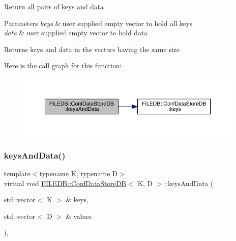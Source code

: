 Return all pairs of keys and data 
\begin{DoxyParams}{Parameters}
{\em keys} & user supplied empty vector to hold all keys \\
\hline
{\em data} & user supplied empty vector to hold data \\
\hline
\end{DoxyParams}
\begin{DoxyReturn}{Returns}
keys and data in the vectors having the same size 
\end{DoxyReturn}
Here is the call graph for this function\+:
\nopagebreak
\begin{figure}[H]
\begin{center}
\leavevmode
\includegraphics[width=350pt]{d8/d19/classFILEDB_1_1ConfDataStoreDB_a94333e6aab463fd336bffb28d81dd39d_cgraph}
\end{center}
\end{figure}
\mbox{\label{classFILEDB_1_1ConfDataStoreDB_a94333e6aab463fd336bffb28d81dd39d}} 
\subsubsection{\texorpdfstring{keysAndData()}{keysAndData()}\hspace{0.1cm}{\footnotesize\ttfamily [2/3]}}
{\footnotesize\ttfamily template$<$typename K, typename D$>$ \\
virtual void \mbox{\hyperlink{classFILEDB_1_1ConfDataStoreDB}{F\+I\+L\+E\+D\+B\+::\+Conf\+Data\+Store\+DB}}$<$ K, D $>$\+::keys\+And\+Data (\begin{DoxyParamCaption}\item[{std\+::vector$<$ K $>$ \&}]{keys,  }\item[{std\+::vector$<$ D $>$ \&}]{values }\end{DoxyParamCaption})\hspace{0.3cm}{\ttfamily [inline]}, {\ttfamily [virtual]}}

